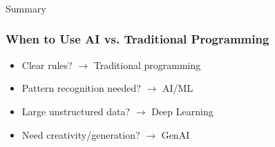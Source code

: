 % 
% 
% 
% 


\begin{frame}[fragile]\frametitle{}
\begin{center}
{\Large Summary}
\end{center}
\end{frame}

\begin{frame}[fragile]\frametitle{When to Use AI vs. Traditional Programming}
\begin{itemize}
\item Clear rules? $\rightarrow$ Traditional programming
\item Pattern recognition needed? $\rightarrow$ AI/ML
\item Large unstructured data? $\rightarrow$ Deep Learning
\item Need creativity/generation? $\rightarrow$ GenAI
\end{itemize}
\end{frame}


